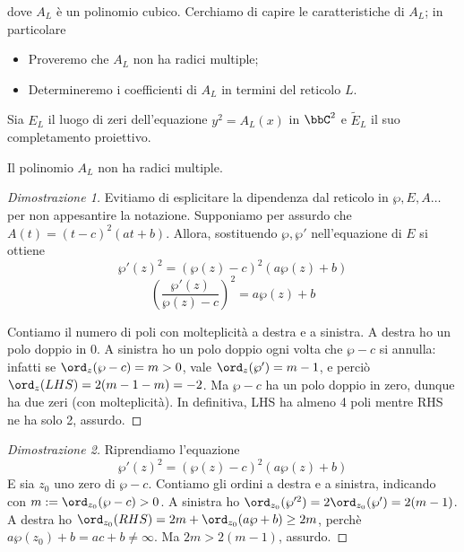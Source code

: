 dove $A_L$ è un polinomio cubico. Cerchiamo di capire le caratteristiche di $A_L$; in particolare
\begin{itemize}
\item Proveremo che $A_L$ non ha radici multiple;
\item Determineremo i coefficienti di $A_L$ in termini del reticolo $L$.
\end{itemize}

Sia $E_L$ il luogo di zeri dell'equazione $y^2=A_L(x)$ in $\bbC^2$ e $\tilde{E}_L$ il suo completamento proiettivo.
\begin{proposizione}
Il polinomio $A_L$ non ha radici multiple.
\end{proposizione}

\begin{proof}[Dimostrazione 1]
Evitiamo di esplicitare la dipendenza dal reticolo in $\wp, E,A \dots$ per non appesantire la notazione. Supponiamo per assurdo che $A(t) = (t-c)^2(at+b)$. Allora, sostituendo $\wp, \wp'$ nell'equazione di $E$ si ottiene
$$\wp'(z)^2 = (\wp(z) - c)^2(a\wp(z)+b) $$
$$ \left ( \frac{\wp'(z)}{\wp(z)-c} \right )^2 = a\wp(z)+b $$

Contiamo il numero di poli con molteplicità a destra e a sinistra. A destra ho un polo doppio in $0$. A sinistra ho un polo doppio ogni volta che $\wp - c$ si annulla: infatti se $\ord_{z}(\wp -c) = m > 0$, vale $\ord_{z}(\wp') = m-1$, e perciò $\ord_{z}(LHS) = 2(m-1-m) = -2$. Ma $\wp-c$ ha un polo doppio in zero, dunque ha due zeri (con molteplicità). In definitiva, LHS ha almeno 4 poli mentre RHS ne ha solo 2, assurdo.
\end{proof}

\begin{proof}[Dimostrazione 2]
Riprendiamo l'equazione
$$\wp'(z)^2 = (\wp(z) - c)^2(a\wp(z)+b) $$
E sia $z_0$ uno zero di $\wp-c$. Contiamo gli ordini a destra e a sinistra, indicando con $m:=\ord_{z_0}(\wp-c) > 0$.
A sinistra ho $\ord_{z_0}( \wp'^2) = 2\ord_{z_0}( \wp') = 2(m-1)$. A destra ho $\ord_{z_0}(RHS) = 2m + \ord_{z_0}(a\wp+b) \ge 2m$, perchè $a \wp(z_0)+b = ac+b \neq \infty$. Ma $2m> 2(m-1)$, assurdo.
\end{proof}

